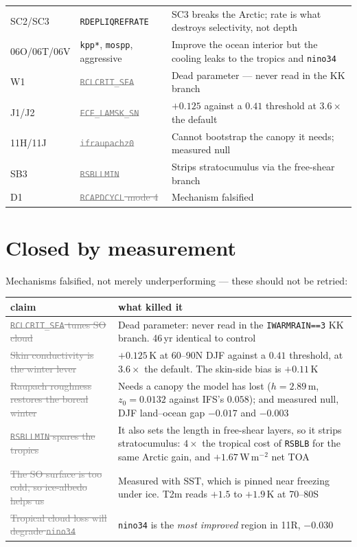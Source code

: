 \documentclass[10pt]{article}
\newcommand{\dead}[1]{\textcolor{gray}{\sout{#1}}}
\begin{document}
\begin{center}
\begin{tabular}{p{} p{} p{}}
SC2/SC3 & \texttt{RDEPLIQREFRATE} & SC3 breaks the Arctic; rate is what destroys
selectivity, not depth \\
06O/06T/06V & \texttt{kpp*}, \texttt{mospp}, aggressive & Improve the ocean interior but the
cooling leaks to the tropics and \texttt{nino34} \\
\midrule
W1 & \dead{\texttt{RCLCRIT\_SEA}} & Dead parameter --- never read in the KK branch \\
J1/J2 & \dead{\texttt{ECE\_LAMSK\_SN}} & $+0.125$ against a $0.41$ threshold at $3.6\times$
the default \\
11H/11J & \dead{\texttt{ifraupachz0}} & Cannot bootstrap the canopy it needs; measured null \\
SB3 & \dead{\texttt{RSBLLMIN}} & Strips stratocumulus via the free-shear branch \\
D1 & \dead{\texttt{RCAPDCYCL} mode 4} & Mechanism falsified \\
\bottomrule
\end{tabular}
\end{center}

\section{Closed by measurement}\label{sec:closed}
Mechanisms falsified, not merely underperforming --- these should not be retried:

\begin{center}\small
\begin{tabular}{p{} p{}}
\toprule
claim & what killed it \\
\midrule
\dead{\texttt{RCLCRIT\_SEA} tunes SO cloud} & Dead parameter: never read in the
\texttt{IWARMRAIN==3} KK branch. 46\,yr identical to control \\
\dead{Skin conductivity is the winter lever} & $+0.125$\,K at 60--90N DJF against a
$0.41$ threshold, at $3.6\times$ the default. The skin-side bias is $+0.11$\,K \\
\dead{Raupach roughness restores the boreal winter} & Needs a canopy the model has lost
($h=2.89$\,m, $z_0=0.0132$ against IFS's $0.058$); and measured null, DJF land--ocean gap
$-0.017$ and $-0.003$ \\
\dead{\texttt{RSBLLMIN} spares the tropics} & It also sets the length in free-shear
layers, so it strips stratocumulus: $4\times$ the tropical cost of \texttt{RSBLB} for the
same Arctic gain, and $+1.67$\,W\,m$^{-2}$ net TOA \\
\dead{The SO surface is too cold, so ice-albedo helps us} & Measured with SST, which is
pinned near freezing under ice. T2m reads $+1.5$ to $+1.9$\,K at 70--80S \\
\dead{Tropical cloud loss will degrade \texttt{nino34}} & \texttt{nino34} is the
\emph{most improved} region in 11R, $-0.030$ \\
\bottomrule
\end{tabular}
\end{center}
\end{document}
